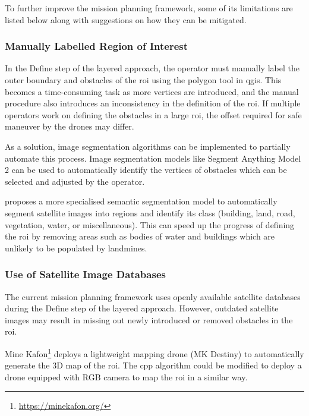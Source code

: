 To further improve the mission planning framework, some of its limitations are listed below along with suggestions on how they can be mitigated. 

\subsubsection{Manually Labelled Region of Interest}

In the Define step of the layered approach, the operator must manually label the outer boundary and obstacles of the \gls{roi} using the polygon tool in \gls{qgis}. This becomes a time-consuming task as more vertices are introduced, and the manual procedure also introduces an inconsistency in the definition of the \gls{roi}. If multiple operators work on defining the obstacles in a large \gls{roi}, the offset required for safe maneuver by the drones may differ. 

As a solution, image segmentation algorithms can be implemented to partially automate this process. Image segmentation models like Segment Anything Model 2 \cite{ravi2024sam2} can be used to automatically identify the vertices of obstacles which can be selected and adjusted by the operator. 

\cite{patil2022segment} proposes a more specialised semantic segmentation model to automatically segment satellite images into regions and identify its class (building, land, road, vegetation, water, or miscellaneous). This can speed up the progress of defining the \gls{roi} by removing areas such as bodies of water and buildings which are unlikely to be populated by landmines. 

\subsubsection{Use of Satellite Image Databases}
\label{sec:msp_satellite_database_limitation}

The current mission planning framework uses openly available satellite databases during the Define step of the layered approach. However, outdated satellite images may result in missing out newly introduced or removed obstacles in the \gls{roi}. 

Mine Kafon\footnote{\url{https://minekafon.org/}} deploys a lightweight mapping drone (MK Destiny) to automatically generate the 3D map of the \gls{roi}. The \gls{cpp} algorithm could be modified to deploy a drone equipped with RGB camera to map the \gls{roi} in a similar way.  

